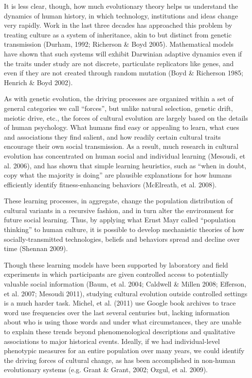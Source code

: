 \documentclass{article}
\begin{document}
It is less clear, though, how much evolutionary theory helps us understand the dynamics of human history, in which technology, institutions and ideas change very rapidly.  Work in the last three decades has approached this problem by treating culture as a system of inheritance, akin to but distinct from genetic transmission (Durham, 1992; Richerson \& Boyd 2005).  Mathematical models have shown that such systems will exhibit Darwinian adaptive dynamics even if the traits under study are not discrete, particulate replicators like genes, and even if they are not created through random mutation (Boyd \& Richerson 1985; Henrich \& Boyd 2002).  

As with genetic evolution, the driving processes are organized within a set of general categories we call ``forces'', but unlike natural selection, genetic drift, meiotic drive, etc., the forces of cultural evolution are largely based on the details of human psychology.  What humans find easy or appealing to learn, what cues and associations they find salient, and how readily certain cultural traits encourage their own social transmission.  As a result, much research in cultural evolution has concentrated on human social and individual learning (Mesoudi, et al. 2006), and has shown that simple learning heuristics, such as ``when in doubt, copy what the majority is doing'' are plausible explanations for how humans efficiently identify fitness-enhancing behaviors (McElreath, et al. 2008).

These learning processes, in aggregate, change the population distribution of cultural variants in a recursive fashion, and in turn alter the environment for future social learning.  Thus, by applying what Ernst Mayr called ``population thinking'' to human culture, it is possible to develop mechanistic theories of how socially-transmitted technologies, beliefs and behaviors spread and decline over time (Shennan 2009).
 
Though these learning models have been supported by laboratory and field experiments in which participants are given controlled access to potentially valuable social information (Baum, et al. 2004; Caldwell \& Millen 2008; Efferson, et al. 2007; Mesoudi 2011), studying cultural evolution outside controlled settings is a much harder task.  Michel, et al. (2011) use Google book archives to trace word use frequencies over the last several centuries but, lacking information about who is using those words and under what circumstances, they are unable to explain these trends beyond phenomenological descriptions and qualitative associations to major historical events.  Ideally, if we had individual-level phenotypic measures for an entire population over many years, we could identify the driving forces of cultural change, as has been accomplished in non-human evolutionary systems (e.g. Grant \& Grant, 2002; Ozgul, et al. 2009).  
\end{document}
